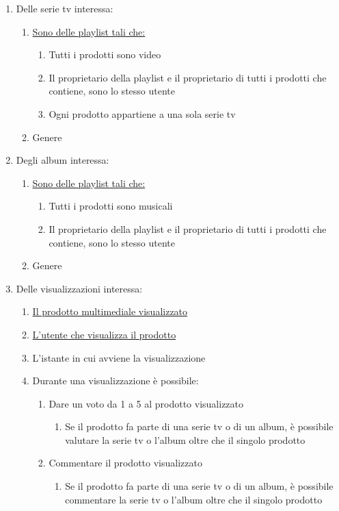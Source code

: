 \begin{enumerate}
\item \hypertarget{AnReqSerieTv}{Delle serie tv interessa:}
	\begin{enumerate}[label*=\arabic*.]
	\item \hyperlink{AnReqPlaylist}{Sono delle playlist tali che:}
		\begin{enumerate}[label*=\arabic*.]
		\item Tutti i prodotti sono video
		\item Il proprietario della playlist e il proprietario di tutti i prodotti che contiene, sono lo stesso utente
		\item Ogni prodotto appartiene a una sola serie tv
		\end{enumerate}
	\item Genere
	\end{enumerate}

\item \hypertarget{AnReqAlbum}{Degli album interessa:}
	\begin{enumerate}[label*=\arabic*.]
	\item \hyperlink{AnReqPlaylist}{Sono delle playlist tali che:}
		\begin{enumerate}[label*=\arabic*.]
		\item Tutti i prodotti sono musicali
		\item Il proprietario della playlist e il proprietario di tutti i prodotti che contiene, sono lo stesso utente
		\end{enumerate}
	\item Genere
	\end{enumerate}

\item \hypertarget{AnReqVisual}{Delle visualizzazioni interessa:}
	\begin{enumerate}[label*=\arabic*.]
	\item \hyperlink{AnReqProdMult}{Il prodotto multimediale visualizzato}
	\item \hyperlink{AnReqUt}{L'utente che visualizza il prodotto}
	\item L'istante in cui avviene la visualizzazione
	\item Durante una visualizzazione è possibile:
		\begin{enumerate}[label*=\arabic*.]
		\item Dare un voto da 1 a 5 al prodotto visualizzato
			\begin{enumerate}[label*=\arabic*.]
			\item Se il prodotto fa parte di una serie tv o di un album, è possibile valutare la serie tv o l'album oltre che il singolo prodotto
			\end{enumerate}
		\item Commentare il prodotto visualizzato
			\begin{enumerate}[label*=\arabic*.]
			\item Se il prodotto fa parte di una serie tv o di un album, è possibile commentare la serie tv o l'album oltre che il singolo prodotto
			\end{enumerate}
		\end{enumerate}
	\end{enumerate}


\end{enumerate}
